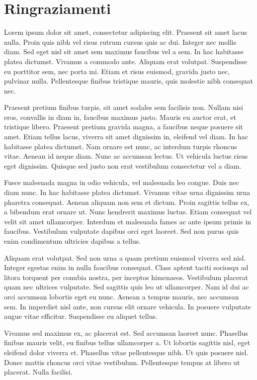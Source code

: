 \documentclass[12pt,a4paper,openright,twoside]{report}
\begin{document}
\chapter*{Ringraziamenti}
Lorem ipsum dolor sit amet, consectetur adipiscing elit. Praesent sit amet lacus nulla. Proin quis nibh vel risus rutrum cursus quis ac dui. Integer nec mollis diam. Sed eget nisl sit amet sem maximus faucibus vel a sem. In hac habitasse platea dictumst. Vivamus a commodo ante. Aliquam erat volutpat. Suspendisse eu porttitor sem, nec porta mi. Etiam et risus euismod, gravida justo nec, pulvinar nulla. Pellentesque finibus tristique mauris, quis molestie nibh consequat nec.

Praesent pretium finibus turpis, sit amet sodales sem facilisis non. Nullam nisi eros, convallis in diam in, faucibus maximus justo. Mauris eu auctor erat, et tristique libero. Praesent pretium gravida magna, a faucibus neque posuere sit amet. Etiam tellus lacus, viverra sit amet dignissim in, eleifend vel diam. In hac habitasse platea dictumst. Nam ornare est nunc, ac interdum turpis rhoncus vitae. Aenean id neque diam. Nunc ac accumsan lectus. Ut vehicula luctus risus eget dignissim. Quisque sed justo non erat vestibulum consectetur vel a diam.

Fusce malesuada magna in odio vehicula, vel malesuada leo congue. Duis nec diam nunc. In hac habitasse platea dictumst. Vivamus vitae urna dignissim urna pharetra consequat. Aenean aliquam non sem et dictum. Proin sagittis tellus ex, a bibendum erat ornare ut. Nunc hendrerit maximus luctus. Etiam consequat vel velit sit amet ullamcorper. Interdum et malesuada fames ac ante ipsum primis in faucibus. Vestibulum vulputate dapibus orci eget laoreet. Sed non purus quis enim condimentum ultricies dapibus a tellus.

Aliquam erat volutpat. Sed non urna a quam pretium euismod viverra sed nisl. Integer egestas enim in nulla faucibus consequat. Class aptent taciti sociosqu ad litora torquent per conubia nostra, per inceptos himenaeos. Vestibulum placerat quam nec ultrices vulputate. Sed sagittis quis leo ut ullamcorper. Nam id dui ac orci accumsan lobortis eget eu nunc. Aenean a tempus mauris, nec accumsan sem. In imperdiet nisl ante, non cursus elit ornare vehicula. In posuere vulputate augue vitae efficitur. Suspendisse eu aliquet tellus.

Vivamus sed maximus ex, ac placerat est. Sed accumsan laoreet nunc. Phasellus finibus mauris velit, eu finibus tellus ullamcorper a. Ut lobortis sagittis nisl, eget eleifend dolor viverra et. Phasellus vitae pellentesque nibh. Ut quis posuere nisl. Donec mattis rhoncus orci vitae vestibulum. Pellentesque tempus at libero ut placerat. Nulla facilisi.
\end{document}
